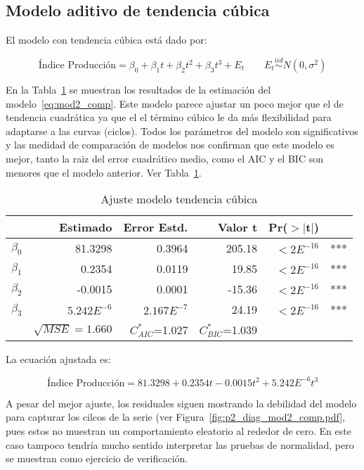 \documentclass{tufte-handout}
\begin{document}
\subsection*{Modelo aditivo de tendencia cúbica}

El modelo con tendencia cúbica está dado por:

\begin{equation} \label{eq:mod2_comp}
	\text{Índice Producción} = \beta_0 + \beta_1 t + \beta_2 t^2 + \beta_3 t^3 + E_t
	\qquad E_t \stackrel{iid}{\sim} N(0, \sigma^2)
\end{equation}

En la Tabla~\ref{tab:mod2_comp} se muestran los resultados de la estimación del modelo~\ref{eq:mod2_comp}. Este modelo parece ajustar un poco mejor que el de tendencia cuadrática ya que el el término cúbico le da más flexibilidad para adaptarse a las curvas (ciclos). Todos los parámetros del modelo son significativos y las medidad de comparación de modelos nos confirman que este modelo es mejor, tanto la raiz del error cuadrático medio, como el AIC y el BIC son menores que el modelo anterior. Ver Tabla~\ref{tab:mod2_comp}.

\begin{table}[ht]
\centering
\begin{tabular}{lrrrrl}
          & Estimado & Error Estd. & Valor t & Pr($>$$|$t$|$) & \\ 
  \hline
$\beta_0$ & 81.3298 & 0.3964 & 205.18 & $<2E^{-16}$ & *** \\ 
  $\beta_1$ & 0.2354 & 0.0119 & 19.85 & $<2E^{-16}$ & *** \\ 
  $\beta_2$ & -0.0015 & 0.0001 & -15.36 & $<2E^{-16}$ & *** \\ 
  $\beta_3$ & $5.242E^{-6}$ & $2.167E^{-7}$ & 24.19 & $<2E^{-16}$ & *** \\ 
   \hline
            & $\sqrt{MSE}=1.660$ & $C^{*}_{AIC}$=1.027 & $C^{*}_{BIC}$=1.039 & \\
   \hline
\end{tabular}
\caption{Ajuste modelo tendencia cúbica} 
\label{tab:mod2_comp}
\end{table}

La ecuación ajustada es:

\begin{equation}
	\text{Índice Producción} = 81.3298 + 0.2354 t - 0.0015 t^2 + 5.242E^{-6} t^3
\end{equation}

A pesar del mejor ajuste, los residuales siguen mostrando la debilidad del modelo para capturar los cilcos de la serie (ver Figura~\ref{fig:p2_diag_mod2_comp.pdf}, pues estos no muestran un comportamiento eleatorio al rededor de cero. En este caso tampoco tendría mucho sentido interpretar las pruebas de normalidad, pero se muestran como ejercicio de verificación.
\end{document}
